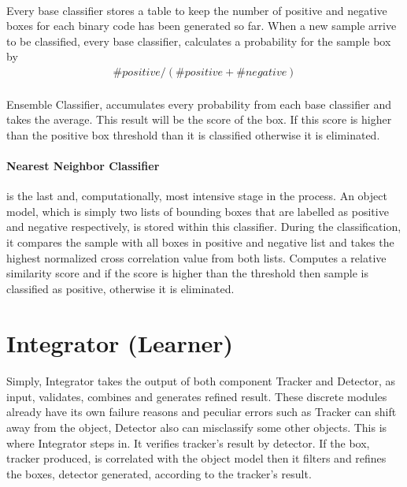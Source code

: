 \documentclass{report}
\begin{document}
        \paragraph{}
            Every base classifier stores a table to keep the number of positive and negative boxes
            for each binary code has been generated so far. When a new sample arrive to be classified,
            every base classifier, calculates a probability for the sample box by
            \begin{gather}
                \#positive / (\#positive + \#negative)
            \end{gather}
        \paragraph{}
            Ensemble Classifier, accumulates every probability from each base classifier and takes the average. This result
            will be the score of the box. If this score is higher than the positive box threshold than it is classified otherwise
            it is eliminated.
        \paragraph{Nearest Neighbor Classifier} is the last and, computationally, most intensive stage in the process.
            An object model, which is simply two lists of bounding boxes that are labelled as positive and negative respectively,
            is stored within this classifier. During the classification, it compares the sample with all
            boxes in positive and negative list and takes the highest normalized cross correlation value from both lists.
            Computes a relative similarity score and if the score is higher than the threshold then sample is
            classified as positive, otherwise it is eliminated.
    \section{Integrator (Learner)}
        \paragraph{}
            Simply, Integrator takes the output of both component Tracker and Detector, as input, validates, combines
            and generates refined result. These discrete modules already have its own failure reasons
            and peculiar errors such as Tracker can shift away from the object, Detector also can misclassify some other objects. This is
            where Integrator steps in. It verifies tracker's result by detector. If the box, tracker produced, is correlated with the object model
            then it filters and refines the boxes, detector generated, according to the tracker's result.
\end{document}
